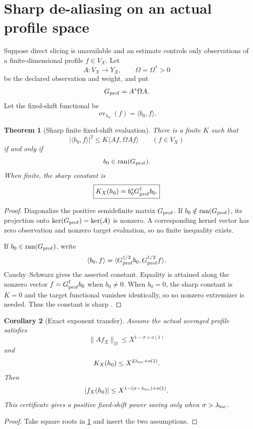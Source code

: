 \documentclass[11pt]{article}
\newtheorem{theorem}{Theorem}[section]
\newtheorem{corollary}[theorem]{Corollary}
\theoremstyle{definition}
\theoremstyle{remark}
\newcommand{\Ran}{\operatorname{ran}}
\newcommand{\Ker}{\operatorname{ker}}
\begin{document}
\section{Sharp de-aliasing on an actual profile space}

Suppose direct slicing is unavailable and an estimate controls only
observations of a finite-dimensional profile \(f\in V_X\).  Let
\[
 A:V_X\to Y_X,\qquad \Omega=\Omega^*>0
\]
be the declared observation and weight, and put
\[
 G_{\rm prof}=A^*\Omega A.
\]
Let the fixed-shift functional be
\[
 \operatorname{ev}_{h_0}(f)=\langle b_0,f\rangle.
\]

\begin{theorem}[Sharp finite fixed-shift evaluation]
\label{thm:localization}
There is a finite \(K\) such that
\[
 |\langle b_0,f\rangle|^2
 \le K\langle Af,\Omega Af\rangle
 \qquad(f\in V_X)
\]
if and only if
\[
 b_0\in\Ran(G_{\rm prof}).
\]
When finite, the sharp constant is
\[
 \boxed{
 K_X(h_0)=b_0^*G_{\rm prof}^\dagger b_0.}
\]
\end{theorem}

\begin{proof}
Diagonalize the positive semidefinite matrix
\(G_{\rm prof}\).  If \(b_0\notin\Ran(G_{\rm prof})\), its projection
onto \(\Ker(G_{\rm prof})=\Ker(A)\) is nonzero.  A corresponding
kernel vector has zero observation and nonzero target evaluation, so
no finite inequality exists.

If \(b_0\in\Ran(G_{\rm prof})\), write
\[
 \langle b_0,f\rangle
 =
 \langle G_{\rm prof}^{\dagger/2}b_0,
 G_{\rm prof}^{1/2}f\rangle.
\]
Cauchy--Schwarz gives the asserted constant.  Equality is attained
along the nonzero vector \(f=G_{\rm prof}^\dagger b_0\) when
\(b_0\ne0\).  When \(b_0=0\), the sharp constant is \(K=0\) and the
target functional vanishes identically, so no nonzero extremizer is
needed.  Thus the constant is sharp
\citep{BenIsraelGreville,WangTPC115}.
\end{proof}

\begin{corollary}[Exact exponent transfer]
\label{cor:exponent}
Assume the actual averaged profile satisfies
\[
 \|Af_X\|_\Omega
 \le X^{1-\sigma+o(1)}
\]
and
\[
 K_X(h_0)\le X^{2\lambda_{\rm loc}+o(1)}.
\]
Then
\[
 |f_X(h_0)|
 \le
 X^{1-(\sigma-\lambda_{\rm loc})+o(1)}.
\]
This certificate gives a positive fixed-shift power saving only when
\(\sigma>\lambda_{\rm loc}\).
\end{corollary}

\begin{proof}
Take square roots in \cref{thm:localization} and insert the two
assumptions.
\end{proof}
\end{document}
